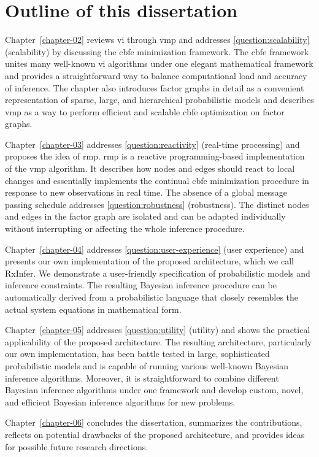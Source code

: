 \section{Outline of this dissertation}\label{chapter-04:section:outline}

Chapter~\ref{chapter-02} reviews \ac{vi} through \ac{vmp} and 
addresses \ref{question:scalability} (scalability) by discussing the \ac{cbfe} minimization framework.
The \ac{cbfe} framework unites many well-known \ac{vi} algorithms under one elegant
mathematical framework and provides a straightforward way to balance computational load
and accuracy of inference.
The chapter also introduces factor graphs in detail as a convenient representation of sparse,
large, and hierarchical probabilistic models and describes \ac{vmp} as a
way to perform efficient and scalable \ac{cbfe} optimization on factor graphs.

Chapter~\ref{chapter-03} addresses \ref{question:reactivity} (real-time processing) and proposes the idea of \ac{rmp}.
\ac{rmp} is a reactive programming-based implementation of the \ac{vmp} algorithm.
It describes how nodes and edges should react to local changes and essentially implements the
continual \ac{cbfe} minimization procedure in response to new observations in real time.
The absence of a global message passing schedule addresses \ref{question:robustness} (robustness).
The distinct nodes and edges in the factor graph are isolated and can be adapted individually
without interrupting or affecting the whole inference procedure.

Chapter~\ref{chapter-04} addresses \ref{question:user-experience} (user experience) and presents our own
implementation of the proposed architecture, which we call RxInfer.
We demonstrate a user-friendly specification of probabilistic models and inference constraints.
The resulting Bayesian inference procedure can be automatically derived from a probabilistic
language that closely resembles the actual system equations in mathematical form.

Chapter~\ref{chapter-05} addresses \ref{question:utility} (utility) and shows the practical
applicability of the proposed architecture.
The resulting architecture, particularly our own implementation, has been battle tested in
large, sophisticated probabilistic models and is capable of running various
well-known Bayesian inference algorithms.
Moreover, it is straightforward to combine different Bayesian inference algorithms under one
framework and develop custom, novel, and efficient Bayesian inference algorithms for new problems.

Chapter~\ref{chapter-06} concludes the dissertation, summarizes the contributions, reflects on
potential drawbacks of the proposed architecture, and provides ideas for possible future
research directions.

